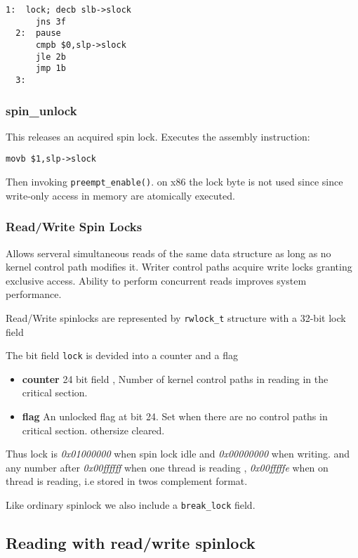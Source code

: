 \documentclass{article}
\begin{document}
\begin{lstlisting}[language=anX86]
  1:  lock; decb slb->slock
      jns 3f
  2:  pause
      cmpb $0,slp->slock
      jle 2b
      jmp 1b
  3: 
\end{lstlisting}

\subsubsection{spin\_unlock}

This releases an acquired spin lock. Executes the assembly instruction:


\begin{lstlisting}[language=anX86]
  movb $1,slp->slock
\end{lstlisting}

Then invoking \lstinline{preempt_enable()}. on x86 the lock byte is
not used since since write-only access in memory are atomically
executed.

\subsubsection{Read/Write Spin Locks}

Allows serveral simultaneous reads of the same data structure as long
as no kernel control path modifies it. Writer control paths acquire
write locks granting exclusive access. Ability to perform concurrent
reads improves system performance.

Read/Write spinlocks are represented by \lstinline{rwlock_t} structure
with a 32-bit lock field

The bit field \lstinline{lock} is devided into a counter and a flag
\begin{itemize}
\item \textbf{counter} 24 bit field , Number of kernel control paths
  in reading in the critical section.
  \item \textbf{flag} An unlocked flag at bit 24. Set when there are no
    control paths in critical section. othersize cleared.
\end{itemize}

Thus lock is \emph{0x01000000} when spin lock idle and
\emph{0x00000000} when writing. and any number after \emph{0x00ffffff}
when one thread is reading , \emph{0x00fffffe} when on thread is
reading, i.e stored in twos complement format.

Like ordinary spinlock we also include a \lstinline{break_lock} field.

\subsection{Reading with read/write spinlock}
\end{document}
